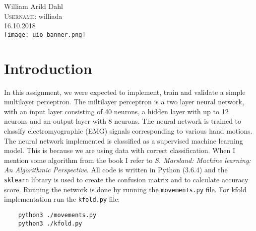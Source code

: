 \documentclass[a4paper, norsk, 12pt]{article}
\begin{document}
\begin{titlepage}
William Arild Dahl\\ %
\textsc{Username:} williada\\[3cm]




{\large 16.10.2018}\\[2cm] %


\texttt{[image: uio\_banner.png]}\\[1cm] %


\vfill %
\end{titlepage}


\section{Introduction}


In this assignment, we were expected to implement, train and validate a simple multilayer perceptron. The miltilayer perceptron is a two layer neural network, with an input layer consisting of 40 neurons, a hidden layer with up to 12 neurons and an output layer with 8 neurons. The neural network is trained to classify electromyographic (EMG) signals corresponding to various hand motions. The neural network implemented is classified as a supervised machine learning model. This is because we are using data with correct classification.\newline\newline 
When I mention some algorithm from the book I refer to \textit{S. Marsland: Machine learning: An Algorithmic Perspective}.  All code is written in Python (3.6.4) and the \texttt{sklearn} library is used to create the confusion matrix and to calculate accuracy score. Running the network is done by running the \texttt{movements.py} file. For kfold implementation run the \texttt{kfold.py} file:\newline\newline 
	\begin{lstlisting}
	python3 ./movements.py
	python3 ./kfold.py
	
	\end{lstlisting}
\end{document}
